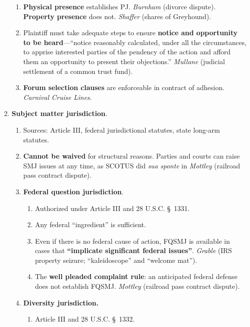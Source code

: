 \begin{enumerate}
\begin{enumerate}
        \item \textbf{Physical presence} establishes PJ. \emph{Burnham} 
        (divorce dispute). \textbf{Property presence} does not.  
        \emph{Shaffer} (shares of Greyhound).
        \item Plaintiff must take adequate steps to ensure \textbf{notice and 
        opportunity to be heard}---``notice reasonably calculated, under all 
        the circumstances, to apprise interested parties of the pendency of 
        the action and afford them an opportunity to present their 
        objections.'' \emph{Mullane} (judicial settlement of a common trust 
        fund).
        \item \textbf{Forum selection clauses} are enforceable in contract of 
        adhesion. \emph{Carnival Cruise Lines}.
    \end{enumerate}
    \item \textbf{Subject matter jurisdiction}.
    \begin{enumerate}
        \item Sources: Article III, federal jurisdictional statutes, state 
        long-arm statutes.
        \item \textbf{Cannot be waived} for structural reasons. Parties and 
        courts can raise SMJ issues at any time, as SCOTUS did \emph{sua 
        sponte} in \emph{Mottley} (railroad pass contract dispute).
        \item \textbf{Federal question jurisdiction}.
        \begin{enumerate}
            \item Authorized under Article III and 28 U.S.C. \S\ 1331.
            \item Any federal ``ingredient'' is sufficient.
            \item Even if there is no federal cause of action, FQSMJ is 
            available in cases that \textbf{``implicate significant federal 
            issues''}. \emph{Grable} (IRS property seizure; ``kaleidoscope'' 
            and ``welcome mat'').
            \item The \textbf{well pleaded complaint rule}: an anticipated 
            federal defense does not establish FQSMJ. \emph{Mottley} 
            (railroad pass contract dispute).
        \end{enumerate}
        \item \textbf{Diversity jurisdiction.}
        \begin{enumerate}
            \item Article III and 28 U.S.C. \S\ 1332.

\end{enumerate}
\end{enumerate}
\end{enumerate}
